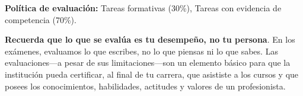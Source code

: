 \documentclass[12pt, letterpaper, oneside]{article}
\begin{document}
  \vspace*{.15in}
  \noindent\textbf{Política de evaluación:}
  Tareas formativas (30\%), Tareas con evidencia de competencia (70\%).
  \vspace*{.15in}

  \noindent\textbf{Recuerda que lo que se evalúa es tu desempeño, no tu persona}.
  En los exámenes, evaluamos lo que escribes, no lo que piensas ni lo que sabes.
  Las evaluaciones---a pesar de sus limitaciones---son un elemento básico para que la institución pueda certificar, al final de tu carrera, que asististe a los cursos y que posees los conocimientos, habilidades, actitudes y valores de un profesionista.

\end{document}
